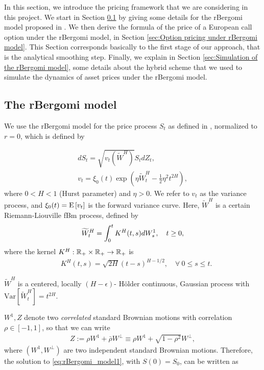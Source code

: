 In this section, we introduce the pricing framework that we are considering in this project. We start in Section \ref{sec:The rBergomi model} by giving some details for the rBergomi model proposed in \cite{bayer2016pricing}. We then derive the formula of the price of a European call option under the rBergomi model, in Section \ref{sec:Option pricing under rBergomi model}. This Section corresponds basically to the first stage of our approach, that is the analytical smoothing step. Finally, we explain in Section \ref{sec:Simulation of the rBergomi model}, some details about the hybrid scheme that we used to simulate the dynamics of asset prices under the rBergomi model.

\subsection{The rBergomi model}\label{sec:The rBergomi model}

We use  the rBergomi model for the price process $S_t$ as defined in  \cite{bayer2016pricing}, normalized to $r=0$, which is defined by

\begin{align}\label{eq:rBergomi_model1}
	dS_t = \sqrt{v_t(\widetilde{W}^H)} S_t dZ_t, \nonumber \\
	v_t = \xi_0(t) \exp\left( \eta \widetilde{W}_t^H - \frac{1}{2} \eta^2 t^{2H} \right),
\end{align}
where $0 < H < 1$ (Hurst parameter) and  $\eta>0$. We refer to $v_t$ as the variance process, and $\xi_0(t) = \mathrm{E}\left[v_t\right]$ is  the forward variance curve.  Here, $\widetilde{W}^H $ is a certain Riemann-Liouville fBm
process,  defined by
\begin{align}\label{eq:Volterra process}
	\widetilde{W}_t^H = \int_0^t K^H(t,s) dW_s^1, \quad t \ge 0 ,
\end{align}
where the kernel $K^H : \mathbb{R}_+ \times \mathbb{R}_+ \rightarrow \mathbb{R}_+$ is
\begin{align*}
 \quad K^H(t,s) = \sqrt{2H} (t-s)^{H - 1/2},\quad \forall \: 0 \le s \le t.
\end{align*}

 $\widetilde{W}^H $ is a centered, locally $(H-\epsilon)$- H\"older continuous, Gaussian process with $\text{Var}\left[\widetilde{W}^H_t \right] = t^{2H}$.

$W^1, Z$ denote two \emph{correlated} standard Brownian motions with correlation $\rho \in [-1,1]$, so that we can write
\begin{align*}
	Z:=\rho	W^1+ \bar{\rho}W^\perp \equiv \rho W^1+\sqrt{1-\rho^2} W^\perp,
\end{align*}
where $(W^1,W^\perp)$ are two independent standard Brownian motions.
Therefore, the solution to \eqref{eq:rBergomi_model1}, with $S(0)=S_0$, can be written as 

